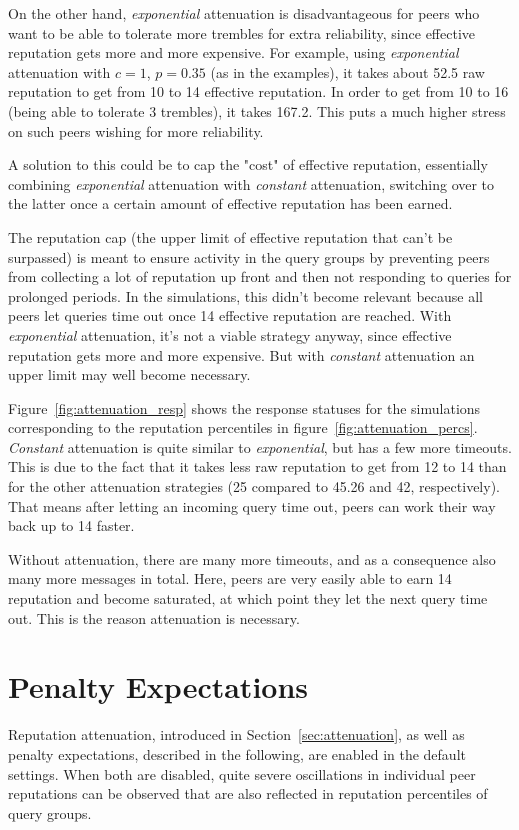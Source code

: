 On the other hand, \emph{exponential} attenuation is disadvantageous for peers
who want to be able to tolerate more trembles for extra reliability, since
effective reputation gets more and more expensive. For example, using
\emph{exponential} attenuation with $c = 1$, $p = 0.35$ (as in the examples), it
takes about 52.5 raw reputation to get from 10 to 14 effective reputation. In
order to get from 10 to 16 (being able to tolerate 3 trembles), it takes 167.2.
This puts a much higher stress on such peers wishing for more reliability.

A solution to this could be to cap the "cost" of effective reputation,
essentially combining \emph{exponential} attenuation with \emph{constant}
attenuation, switching over to the latter once a certain amount of effective
reputation has been earned.

The reputation cap (the upper limit of effective reputation that can't be
surpassed) is meant to ensure activity in the query groups by preventing peers
from collecting a lot of reputation up front and then not responding to queries
for prolonged periods. In the simulations, this didn't become relevant because
all peers let queries time out once 14 effective reputation are reached. With
\emph{exponential} attenuation, it's not a viable strategy anyway, since
effective reputation gets more and more expensive. But with \emph{constant}
attenuation an upper limit may well become necessary.

Figure~\ref{fig:attenuation_resp} shows the response statuses for the
simulations corresponding to the reputation percentiles in
figure~\ref{fig:attenuation_percs}. \emph{Constant} attenuation is quite similar
to \emph{exponential}, but has a few more timeouts. This is due to the fact that
it takes less raw reputation to get from 12 to 14 than for the other attenuation
strategies (25 compared to 45.26 and 42, respectively). That means after letting
an incoming query time out, peers can work their way back up to 14 faster.

Without attenuation, there are many more timeouts, and as a consequence also
many more messages in total. Here, peers are very easily able to earn 14
reputation and become saturated, at which point they let the next query time
out. This is the reason attenuation is necessary.

\section{Penalty Expectations}
\label{sec:penalty_expectations}
Reputation attenuation, introduced in Section~\ref{sec:attenuation}, as well as
penalty expectations, described in the following, are enabled in the default
settings. When both are disabled, quite severe oscillations in individual peer
reputations can be observed that are also reflected in reputation percentiles of
query groups.

